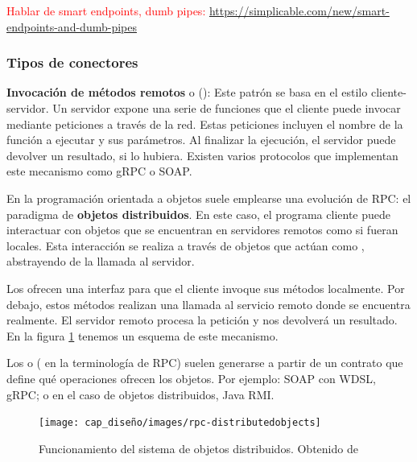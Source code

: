 \textcolor{red}{Hablar de smart endpoints, dumb pipes: \url{https://simplicable.com/new/smart-endpoints-and-dumb-pipes}}

\subsubsection{Tipos de conectores}

\textbf{Invocación de métodos remotos} o (): Este patrón se basa en el estilo cliente-servidor. Un servidor expone una serie de funciones que el cliente puede invocar mediante peticiones a través de la red. Estas peticiones incluyen el nombre de la función a ejecutar y sus parámetros. Al finalizar la ejecución, el servidor puede devolver un resultado, si lo hubiera. Existen varios protocolos que implementan este mecanismo como gRPC o SOAP.

En la programación orientada a objetos suele emplearse una evolución de RPC: el paradigma de \textbf{objetos distribuidos}. \cite{tanenbaumChapter10Distributed2007} En este caso, el programa cliente puede interactuar con objetos que se encuentran en servidores remotos como si fueran locales. Esta interacción se realiza a través de objetos que actúan como , abstrayendo de la llamada al servidor.

Los  ofrecen una interfaz para que el cliente invoque sus métodos localmente. Por debajo, estos métodos realizan una llamada al servicio remoto donde se encuentra realmente. El servidor remoto procesa la petición y nos devolverá un resultado. En la figura \ref{fig:rpc-distributedobjects} tenemos un esquema de este mecanismo.

Los  o ( en la terminología de RPC) suelen generarse a partir de un contrato que define qué operaciones ofrecen los objetos. Por ejemplo: SOAP con WDSL, gRPC; o en el caso de objetos distribuidos, Java RMI.

\begin{figure}[htb]
  \centering
  \texttt{[image: cap\_diseño/images/rpc-distributedobjects]}
  \caption[Funcionamiento del sistema de objetos distribuidos.]{Funcionamiento del sistema de objetos distribuidos. Obtenido de \cite{tanenbaumChapter10Distributed2007}}
  \label{fig:rpc-distributedobjects}
\end{figure}

